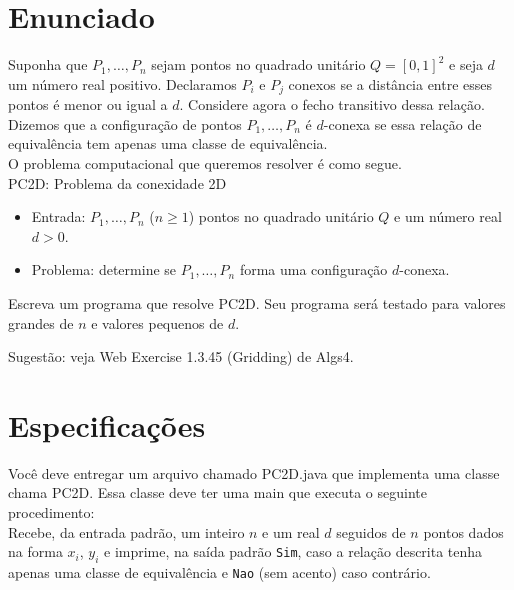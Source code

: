 \documentclass[a4paper,11pt]{article}
\title{\normalfont{Enunciado - Problema da Conexidadade 2D}}
\date{\today}
\begin{document}
\maketitle %

\setcounter{tocdepth}{2} %


\section{Enunciado}
Suponha que $P_1,\dots,P_n$ sejam pontos no quadrado unitário $Q = [0,1]^2$ e seja $d$ um número real positivo. Declaramos $P_i$ e $P_j$ conexos se a distância entre esses pontos é menor ou igual a $d$. Considere agora o fecho transitivo dessa relação. Dizemos que a configuração de pontos $P_1,\dots,P_n$ é $d$-conexa se essa relação de equivalência tem apenas uma classe de equivalência. \\
O problema computacional que queremos resolver é como segue. \\
PC2D: Problema da conexidade 2D

\begin{itemize}
    \item Entrada: $P_1,\dots,P_n$ ($n\geq1$) pontos no quadrado unitário $Q$ e um número real $d>0$.
    \item Problema: determine se $P_1,\dots,P_n$ forma uma configuração $d$-conexa.
\end{itemize}

Escreva um programa que resolve PC2D. Seu programa será testado para valores grandes de $n$ e valores pequenos de $d$.

Sugestão: veja Web Exercise 1.3.45 (Gridding) de Algs4.

\section{Especificações}
Você deve entregar um arquivo chamado PC2D.java que implementa uma classe chama PC2D. Essa classe deve ter uma main que executa o seguinte procedimento: \\
Recebe, da entrada padrão, um inteiro $n$ e um real $d$ seguidos de $n$ pontos dados na forma $x_i$, $y_i$ e imprime, na saída padrão \texttt{Sim}, caso a relação descrita tenha apenas uma classe de equivalência e \texttt{Nao} (sem acento) caso contrário. 
\end{document}
